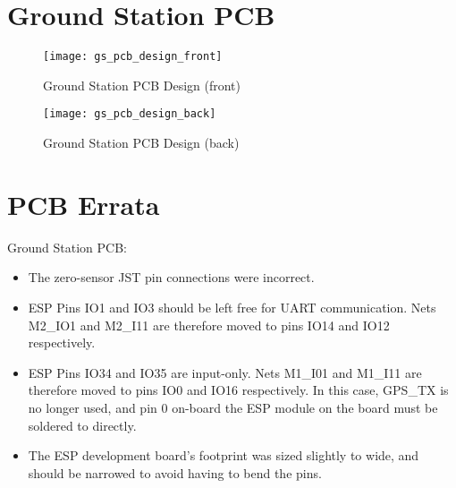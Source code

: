 \clearpage



\section{Ground Station PCB}\label{sec:appendix_gs_pcb_design}
\begin{figure}[!htb]
  \centering
  \texttt{[image: gs\_pcb\_design\_front]}
  \caption{Ground Station PCB Design (front)}
  \label{fig:gs_pcb_design_front}
\end{figure}
\begin{figure}[!htb]
  \centering
  \texttt{[image: gs\_pcb\_design\_back]}
  \caption{Ground Station PCB Design (back)}
  \label{fig:gs_pcb_design_back}
\end{figure}
\clearpage

\section{PCB Errata}\label{sec:appendix_pcb_errata}
Ground Station PCB:
\begin{itemize}
  \item The zero-sensor JST pin connections were incorrect.
  \item ESP Pins IO1 and IO3 should be left free for UART communication. Nets M2\_IO1 and M2\_I11 are therefore moved to pins IO14 and IO12 respectively.
  \item ESP Pins IO34 and IO35 are input-only. Nets M1\_I01 and M1\_I11 are therefore moved to pins IO0 and IO16 respectively. In this case, GPS\_TX is no longer used, and pin 0 on-board the ESP module on the board must be soldered to directly.
  \item The ESP development board's footprint was sized slightly to wide, and should be narrowed to avoid having to bend the pins.
\end{itemize}

